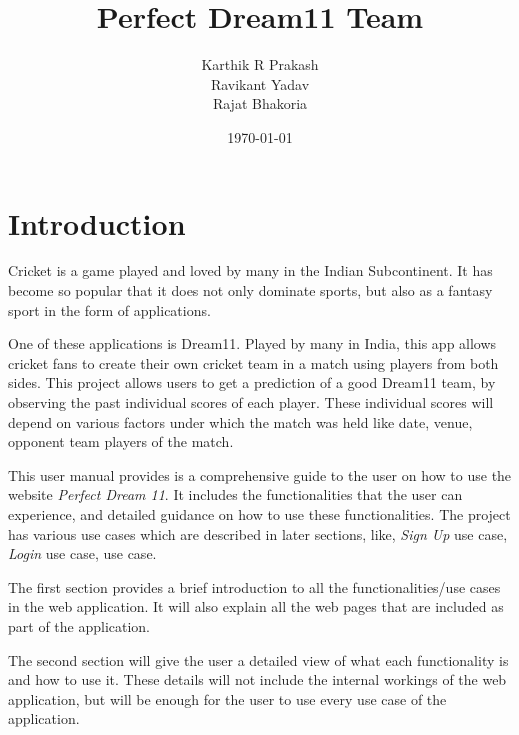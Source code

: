 \documentclass[12pt]{article}
\title{\huge Perfect Dream11 Team}
\author{Karthik R Prakash \\ Ravikant Yadav \\ Rajat Bhakoria \\}
\date{\today}
\begin{document}
\maketitle
\newpage
\tableofcontents
\newpage

\section{Introduction}

\justifying
Cricket is a game played and loved by many in the Indian Subcontinent. It has become so popular that it does not only dominate sports, but also as a fantasy sport in the form of applications.\par
One of these applications is Dream11. Played by many in India, this app allows cricket fans to create their own cricket team in a match using players from both sides. This project allows users to get a prediction of a good Dream11 team, by observing the past individual scores of each player. These individual scores will depend on various factors under which the match was held like date, venue, opponent team players of the match.\par
This user manual provides is a comprehensive guide to the user on how to use the website \textit{Perfect Dream 11}. It includes the functionalities that the user can experience, and detailed guidance on how to use these functionalities. The project has various use cases which are described in later sections, like, \textit{Sign Up} use case, \textit{Login} use case,  use case.\par
The first section provides a brief introduction to all the functionalities/use cases in the web application. It will also explain all the web pages that are included as part of the application.\par
The second section will give the user a detailed view of what each functionality is and how to use it. These details will not include the internal workings of the web application, but will be enough for the user to use every use case of the application.\par

\newpage
\end{document}
